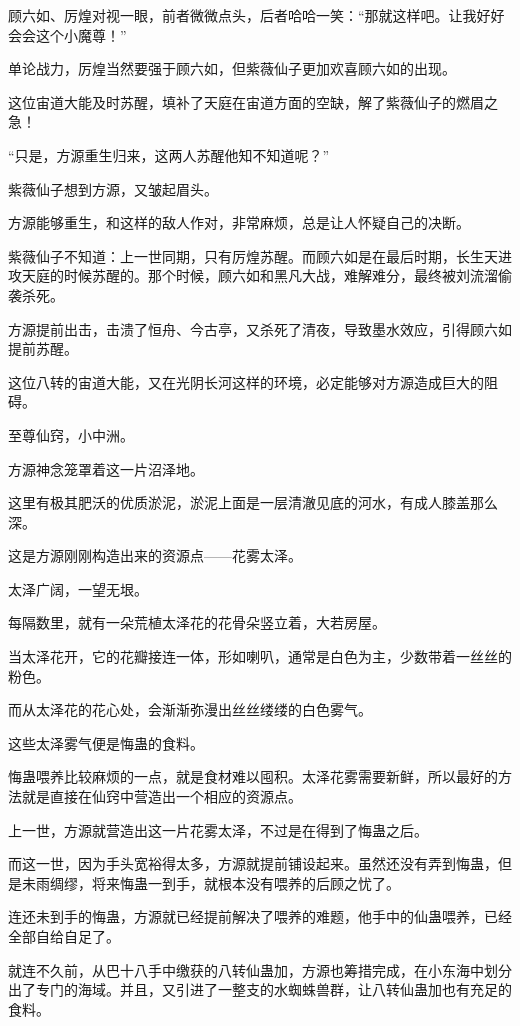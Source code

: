\begin{this_body}
顾六如、厉煌对视一眼，前者微微点头，后者哈哈一笑：“那就这样吧。让我好好会会这个小魔尊！”

单论战力，厉煌当然要强于顾六如，但紫薇仙子更加欢喜顾六如的出现。

这位宙道大能及时苏醒，填补了天庭在宙道方面的空缺，解了紫薇仙子的燃眉之急！

“只是，方源重生归来，这两人苏醒他知不知道呢？”

紫薇仙子想到方源，又皱起眉头。

方源能够重生，和这样的敌人作对，非常麻烦，总是让人怀疑自己的决断。

紫薇仙子不知道：上一世同期，只有厉煌苏醒。而顾六如是在最后时期，长生天进攻天庭的时候苏醒的。那个时候，顾六如和黑凡大战，难解难分，最终被刘流溜偷袭杀死。

方源提前出击，击溃了恒舟、今古亭，又杀死了清夜，导致墨水效应，引得顾六如提前苏醒。

这位八转的宙道大能，又在光阴长河这样的环境，必定能够对方源造成巨大的阻碍。

至尊仙窍，小中洲。

方源神念笼罩着这一片沼泽地。

这里有极其肥沃的优质淤泥，淤泥上面是一层清澈见底的河水，有成人膝盖那么深。

这是方源刚刚构造出来的资源点——花雾太泽。

太泽广阔，一望无垠。

每隔数里，就有一朵荒植太泽花的花骨朵竖立着，大若房屋。

当太泽花开，它的花瓣接连一体，形如喇叭，通常是白色为主，少数带着一丝丝的粉色。

而从太泽花的花心处，会渐渐弥漫出丝丝缕缕的白色雾气。

这些太泽雾气便是悔蛊的食料。

悔蛊喂养比较麻烦的一点，就是食材难以囤积。太泽花雾需要新鲜，所以最好的方法就是直接在仙窍中营造出一个相应的资源点。

上一世，方源就营造出这一片花雾太泽，不过是在得到了悔蛊之后。

而这一世，因为手头宽裕得太多，方源就提前铺设起来。虽然还没有弄到悔蛊，但是未雨绸缪，将来悔蛊一到手，就根本没有喂养的后顾之忧了。

连还未到手的悔蛊，方源就已经提前解决了喂养的难题，他手中的仙蛊喂养，已经全部自给自足了。

就连不久前，从巴十八手中缴获的八转仙蛊加，方源也筹措完成，在小东海中划分出了专门的海域。并且，又引进了一整支的水蜘蛛兽群，让八转仙蛊加也有充足的食料。


\end{this_body}
